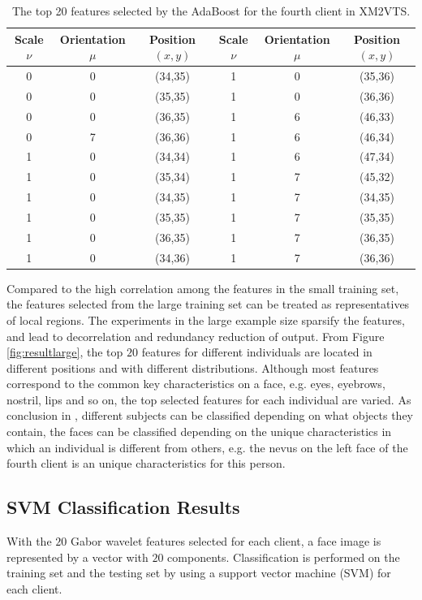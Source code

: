 \begin{table}
\begin{center}
  \begin{tabular}{|c|c|c||c|c|c|}\hline
   \small{Scale $\nu$} & \small{Orientation $\mu$} & \small{Position $(x,y)$} & \small{Scale $\nu$} & \small{Orientation $\mu$} & \small{Position $(x,y)$}\\\hline
   0&0&(34,35)&1&0&(35,36)\\\hline
   0&0&(35,35)&1&0&(36,36)\\\hline
   0&0&(36,35)&1&6&(46,33)\\\hline
   0&7&(36,36)&1&6&(46,34)\\\hline
   1&0&(34,34)&1&6&(47,34)\\\hline
   1&0&(35,34)&1&7&(45,32)\\\hline
   1&0&(34,35)&1&7&(34,35)\\\hline
   1&0&(35,35)&1&7&(35,35)\\\hline
   1&0&(36,35)&1&7&(36,35)\\\hline
   1&0&(34,36)&1&7&(36,36)\\\hline
  \end{tabular}
 \caption{The top 20 features selected by the AdaBoost for the fourth client in XM2VTS.}
 \label{tab:4thclient}
\end{center}
\end{table}

Compared to the high correlation among the features in the small training set, the features selected from the large training set can be treated as representatives of local regions. The experiments in the large example size sparsify the features, and lead to decorrelation and redundancy reduction of output. From \mbox{Figure} \ref{fig:resultlarge}, the top $20$ features for different individuals are located in different positions and with different distributions. Although most features correspond to the common key characteristics on a face, e.g. eyes, eyebrows, nostril, lips and so on, the top selected features for each individual are varied. As conclusion in \cite{Penev1996}, different subjects can be classified depending on what objects they contain, the faces can be classified depending on the unique characteristics in which an individual is different from others, e.g. the nevus on the left face of the fourth client is an unique characteristics for this person.


\subsection{SVM Classification Results}
\label{sec:faceveri:result2}
With the $20$ Gabor wavelet features selected for each client, a face image is represented by a vector with $20$ components. Classification is performed on the training set and the testing set by using a support vector machine (SVM) \cite{Osuna1997} for each client. 
